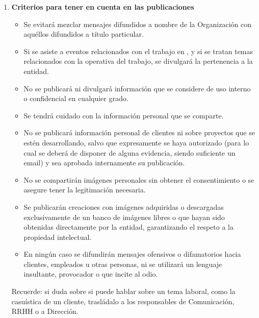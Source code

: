 \begin{enumerate}[label=\alph*)]
\item \textbf{Criterios para tener en cuenta en las publicaciones}
\begin{itemize}
    \item Se evitará mezclar mensajes difundidos a nombre de la Organización con aquéllos difundidos a título particular.
    \item Si se asiste a eventos relacionados con el trabajo en \Beneficiario{}, y si se tratan temas relacionados con la operativa del trabajo, se divulgará la pertenencia a la entidad.
    \item No se publicará ni divulgará información que se considere de uso interno o confidencial en cualquier grado.
    \item Se tendrá cuidado con la información personal que se comparte.
    \item No se publicará información personal de clientes ni sobre proyectos que se estén desarrollando, salvo que expresamente se haya autorizado (para lo cual se deberá de disponer de alguna evidencia, siendo suficiente un email) y sea aprobada internamente su publicación.
    \item No se compartirán imágenes personales sin obtener el consentimiento o se asegure tener la legitimación necesaria.
    \item Se publicarán creaciones con imágenes adquiridas o descargadas exclusivamente de un banco de imágenes libres o que hayan sido obtenidas directamente por la entidad, garantizando el respeto a la propiedad intelectual.
    \item En ningún caso se difundirán mensajes ofensivos o difamatorios hacia clientes, empleados u otras personas, ni se utilizará un lenguaje insultante, provocador o que incite al odio.
\end{itemize}

Recuerde: si duda sobre si puede hablar sobre un tema laboral, como la casuística de un cliente, trasládalo a los responsables de Comunicación, RRHH o a Dirección.


\end{enumerate}
